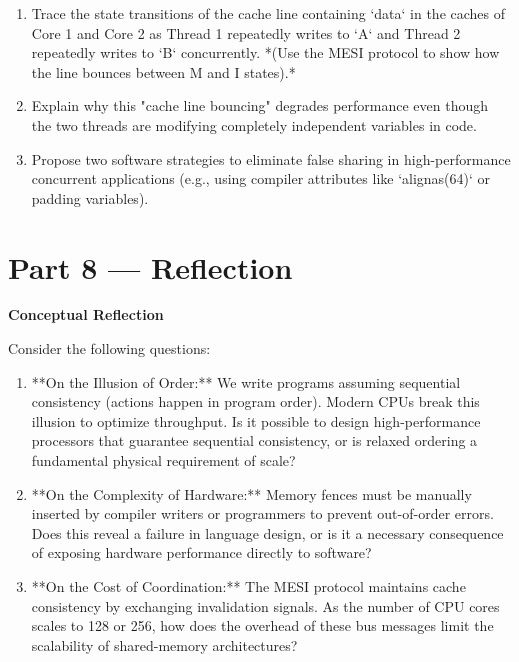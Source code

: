 \documentclass[12pt, a4paper]{book}
\begin{document}
\begin{deepbox}
\begin{enumerate}[label=\textbf{D\arabic*.}]
        \begin{enumerate}[label=(\alph*)]
          \item Trace the state transitions of the cache line containing `data` in the caches of Core 1 and Core 2 as Thread 1 repeatedly writes to `A` and Thread 2 repeatedly writes to `B` concurrently.
                *(Use the MESI protocol to show how the line bounces between M and I states).*
          \item Explain why this "cache line bouncing" degrades performance even though the two threads are modifying completely independent variables in code.
          \item Propose two software strategies to eliminate false sharing in high-performance concurrent applications (e.g., using compiler attributes like `alignas(64)` or padding variables).
        \end{enumerate}
\end{enumerate}
\end{deepbox}

\newpage

\section{Part 8 --- Reflection}

\begin{reflectionbox}
\textbf{Conceptual Reflection}

Consider the following questions:
\begin{enumerate}
  \item **On the Illusion of Order:** We write programs assuming sequential consistency (actions happen in program order). Modern CPUs break this illusion to optimize throughput. Is it possible to design high-performance processors that guarantee sequential consistency, or is relaxed ordering a fundamental physical requirement of scale?
  \item **On the Complexity of Hardware:** Memory fences must be manually inserted by compiler writers or programmers to prevent out-of-order errors. Does this reveal a failure in language design, or is it a necessary consequence of exposing hardware performance directly to software?
  \item **On the Cost of Coordination:** The MESI protocol maintains cache consistency by exchanging invalidation signals. As the number of CPU cores scales to 128 or 256, how does the overhead of these bus messages limit the scalability of shared-memory architectures?
\end{enumerate}
\end{reflectionbox}
\end{document}
